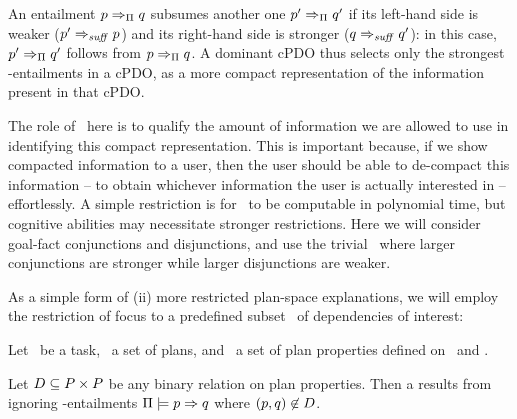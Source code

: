 An entailment $p \Rightarrow_{\Pi} q$ subsumes another one $p'
\Rightarrow_{\Pi} q'$ if its left-hand side is weaker ($p'
\Rightarrow_{\mathit{suff}} p$) and its right-hand side is stronger ($q
\Rightarrow_{\mathit{suff}} q'$): in this case, $p' \Rightarrow_{\Pi} q'$
follows from $p \Rightarrow_{\Pi} q$. A dominant cPDO thus selects
only the strongest \plans-entailments in a cPDO, as a more compact
representation of the information present in that cPDO.%
%

The role of \entailsuff\ here is to qualify the amount of information
we are allowed to use in identifying this compact representation. This
is important because, if we show compacted information to a user, then
the user should be able to de-compact this information -- to obtain
whichever information the user is actually interested in --
effortlessly. A simple restriction is for \entailsuff\ to be
computable in polynomial time, but cognitive abilities may necessitate
stronger restrictions. Here we will consider goal-fact conjunctions
and disjunctions, and use the trivial \entailsuff\ where larger
conjunctions are stronger while larger disjunctions are weaker.

%
%

As a simple form of (ii) more restricted plan-space explanations, we
will employ the restriction of focus to a predefined subset \deps\ of
dependencies of interest:

\begin{definition}
Let \task\ be a task, \plans\ a set of plans, and \props\ a set of
plan properties defined on \task\ and \plans.

Let $D \subseteq P \times P$ be any binary relation on
plan properties. Then a  results from
ignoring \plans-entailments $\Pi \models p \Rightarrow q$ where
$(p,q) \not\in D$.
\end{definition}

